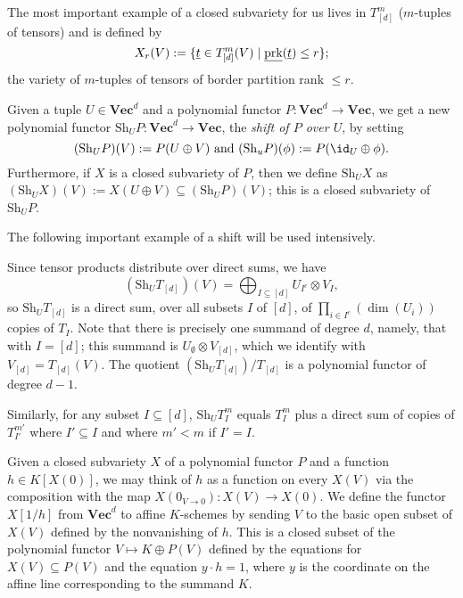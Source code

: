 \documentclass{amsart}
\renewcommand{\Vec}{\mathbf{Vec}}
\newcommand{\Sh}{\mathrm{Sh}}
\newcommand{\prk}{\textnormal{prk}}
\newcommand{\ul}[1]{\underline{#1}}
\begin{document}
The most important example of a closed subvariety for us lives in
$T_{[d]}^m$ ($m$-tuples of tensors) and is defined by
\[ X_r(V) := \{\ul{t} \in T_{[d]}^m(V) \mid \ul{\prk}(\ul{t}) \leq r\}; \]
the variety of $m$-tuples of tensors of border partition rank $\leq r$. 

\begin{de}
Given a tuple $U \in \Vec^d$ and a polynomial functor $P:\Vec^d \to
\Vec$, we get a new polynomial functor $\Sh_U P:\Vec^d \to \Vec$, the
{\em shift of $P$ over $U$}, by setting
\[ (\Sh_U P)(V):=P(U \oplus V)
\text{ and } (\Sh_u P)(\phi):=P(\id_U \oplus \phi). \]
Furthermore, if $X$ is a closed subvariety of $P$, then we define $\Sh_U X$
as $(\Sh_U X)(V):=X(U \oplus V) \subseteq (\Sh_U P)(V)$; this is a closed
subvariety of $\Sh_U P$.
\end{de}

The following important example of a shift will be used intensively.

\begin{ex}
Since tensor products distribute over direct sums, we have
\[ (\Sh_U T_{[d]})(V)  = \bigoplus_{I \subseteq [d]} U_{I^c} \otimes
V_I, \]
so $\Sh_U T_{[d]}$ is a direct sum, over all subsets $I$ of $[d]$,
of $\prod_{i \in I^c} (\dim(U_i))$ copies of $T_I$. Note that there is
precisely one summand of degree $d$, namely, that with $I=[d]$; this
summand 
is $U_\emptyset \otimes V_{[d]}$, which we identify with
$V_{[d]}=T_{[d]}(V)$. The
quotient $(\Sh_U T_{[d]})/T_{[d]}$ is a polynomial functor of degree
$d-1$.

Similarly, for any subset $I \subseteq [d]$, $\Sh_U T_I^m$
equals $T_I^m$ plus a direct sum of copies of $T_{I'}^{m'}$ 
where $I' \subseteq I$ and where $m'<m$ if $I'=I$. 
\end{ex}

\begin{de}
Given a closed subvariety $X$ of a polynomial functor $P$ and a function
$h \in K[X(0)]$, we may think of $h$ as a function on every $X(V)$ via
the composition with the map $X(0_{V \to 0}):X(V) \to X(0)$. We define
the functor $X[1/h]$ from $\Vec^d$ to affine $K$-schemes by sending
$V$ to the basic open subset of $X(V)$ defined by the nonvanishing
of $h$.  This is a closed subset of the polynomial functor $V \mapsto
K \oplus P(V)$ defined by the equations for $X(V) \subseteq P(V)$ and
the equation $y \cdot h = 1$, where $y$ is the coordinate on the affine
line corresponding to the summand $K$. 
\end{de}
\end{document}
